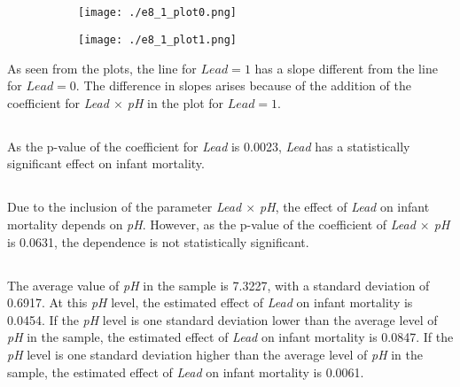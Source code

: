 \documentclass{./solution}
\begin{document}
\begin{solution}
            \subsection{}
                \begin{figure}[H]
                    \centering
                    \begin{subfigure}{0.4\textwidth}
                        \texttt{[image: ./e8\_1\_plot0.png]}
                    \end{subfigure}
                    \begin{subfigure}{0.4\textwidth}
                        \texttt{[image: ./e8\_1\_plot1.png]}
                    \end{subfigure}
                \end{figure}

                As seen from the plots, the line for $Lead = 1$ has a slope different from the line for $Lead = 0$.
                The difference in slopes arises because of the addition of the coefficient for \textit{Lead $\times$ pH} in the plot for $Lead = 1$.

            \subsection{}
                As the p-value of the coefficient for \textit{Lead} is 0.0023, \textit{Lead} has a statistically significant effect on infant mortality.

            \subsection{}
                Due to the inclusion of the parameter \textit{Lead $\times$ pH}, the effect of \textit{Lead} on infant mortality depends on \textit{pH}.
                However, as the p-value of the coefficient of \textit{Lead $\times$ pH} is 0.0631, the dependence is not statistically significant.

            \subsection{}
                The average value of \textit{pH} in the sample is 7.3227, with a standard deviation of 0.6917.
                At this \textit{pH} level, the estimated effect of \textit{Lead} on infant mortality is 0.0454.
                If the \textit{pH} level is one standard deviation lower than the average level of \textit{pH} in the sample, the estimated effect of \textit{Lead} on infant mortality is 0.0847.
                If the \textit{pH} level is one standard deviation higher than the average level of \textit{pH} in the sample, the estimated effect of \textit{Lead} on infant mortality is 0.0061.


\end{solution}
\end{document}
